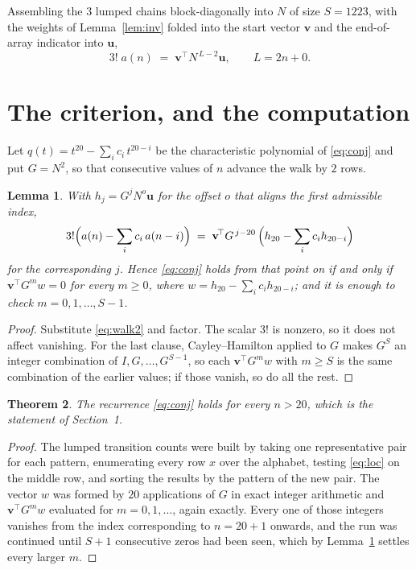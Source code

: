 \documentclass[11pt,a4paper]{article}
\theoremstyle{plain}
\newtheorem{theorem}{Theorem}
\newtheorem{lemma}[theorem]{Lemma}
\theoremstyle{definition}
\begin{document}
Assembling the $3$ lumped chains block-diagonally into $N$ of size $S=1223$, with the
weights of Lemma~\ref{lem:inv} folded into the start vector $\mathbf{v}$ and the
end-of-array indicator into $\mathbf{u}$,
\begin{equation}\label{eq:walk2}
3!\;a(n)\;=\;\mathbf{v}^{\!\top}N^{\,L-2}\mathbf{u},\qquad L=2n+0 .
\end{equation}

\section{The criterion, and the computation}

Let $q(t)=t^{20}-\sum_i c_i\,t^{20-i}$ be the characteristic polynomial of
\eqref{eq:conj} and put $G=N^{2}$, so that consecutive values of $n$ advance the
walk by $2$ rows.

\begin{lemma}\label{lem:crit}
With $h_j=G^{j}N^{o}\mathbf{u}$ for the offset $o$ that aligns the first admissible
index,
\[
3!\Bigl(a(n)-\sum_i c_i\,a(n-i)\Bigr)\;=\;\mathbf{v}^{\!\top}G^{\,j-20}\,
\Bigl(h_{20}-\sum_i c_i h_{20-i}\Bigr)
\]
for the corresponding $j$. Hence \eqref{eq:conj} holds from that point on if and only if
$\mathbf{v}^{\!\top}G^{m}w=0$ for every $m\ge0$, where
$w=h_{20}-\sum_i c_ih_{20-i}$; and it is enough to check $m=0,1,\dots,S-1$.
\end{lemma}

\begin{proof}
Substitute \eqref{eq:walk2} and factor. The scalar $3!$ is nonzero, so it does not
affect vanishing. For the last clause, Cayley--Hamilton applied to $G$ makes $G^{S}$ an
integer combination of $I,G,\dots,G^{S-1}$, so each $\mathbf{v}^{\!\top}G^{m}w$ with
$m\ge S$ is the same combination of the earlier values; if those vanish, so do all the rest.
\end{proof}

\begin{theorem}
The recurrence \eqref{eq:conj} holds for every $n>20$, which is the statement of
Section~1.
\end{theorem}

\begin{proof}
The lumped transition counts were built by taking one representative pair for each pattern,
enumerating every row $x$ over the alphabet, testing \eqref{eq:loc} on the middle
row, and sorting the results by the pattern of the new pair. The vector $w$ was formed by
$20$ applications of $G$ in exact integer arithmetic and $\mathbf{v}^{\!\top}G^{m}w$
evaluated for $m=0,1,\dots$, again exactly. Every one of those integers vanishes from the
index corresponding to $n=20+1$ onwards, and the run was continued until $S+1$
consecutive zeros had been seen, which by Lemma~\ref{lem:crit} settles every larger $m$.
\end{proof}
\end{document}
